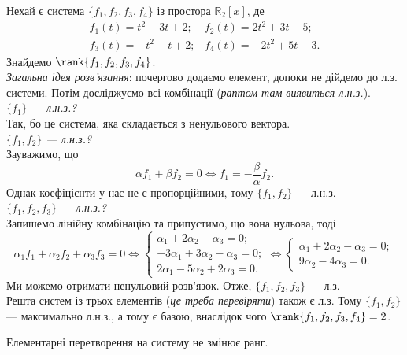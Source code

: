 \documentclass{math_library}
\begin{document}
	\begin{example}
	Нехай є система $\{f_1, f_2, f_3, f_4\}$ із простора $\mathbb{R}_2[x]$, де
	\[
	\begin{matrix}
	f_1(t) = t^2-3t+2; & f_2(t) = 2t^2+3t-5; \\
	f_3(t) = -t^2-t+2; & f_4(t) = -2t^2+5t-3.
	\end{matrix}
	\]
	Знайдемо $\rank \{f_1, f_2, f_3, f_4\}$.
	\bigskip \\
	\textit{Загальна ідея розв'язання}: почергово додаємо елемент, допоки не дійдемо до л.з. системи. Потім досліджуємо всі комбінації (\textit{раптом там виявиться л.н.з.}).\\
	\textit{$\{f_1\}$ --- л.н.з.?} \\
	Так, бо це система, яка складається з ненульового вектора.\\
	\textit{$\{f_1, f_2 \}$ --- л.н.з.?} \\
	Зауважимо, що
	\[
	\alpha f_1 + \beta f_2 = 0 \iff \displaystyle f_1 = -\frac{\beta}{\alpha}f_2.
	\]
	Однак коефіцієнти у нас не є пропорційними, тому $\{f_1, f_2\}$ --- л.н.з.\\
	\textit{$\{f_1, f_2, f_3\}$ --- л.н.з.?}\\
	Запишемо лінійну комбінацію та припустимо, що вона нульова, тоді
	\[
	\alpha_1 f_1 + \alpha_2 f_2 + \alpha_3 f_3 = 0 \iff 
	\begin{cases}
	\alpha_1 + 2\alpha_2 - \alpha_3 = 0; \\
	-3\alpha_1 + 3\alpha_2 - \alpha_3 = 0; \\
	2\alpha_1 - 5\alpha_2 + 2\alpha_3 = 0.
	\end{cases} \iff
	\begin{cases}
	\alpha_1 + 2\alpha_2 - \alpha_3 = 0; \\
	9\alpha_2 - 4\alpha_3 = 0.
	\end{cases}
	\]
	Ми можемо отримати ненульовий розв'язок. Отже, $\{f_1, f_2, f_3\}$ --- л.з.\\
	Решта систем із трьох елементів (\textit{це треба перевіряти}) також є л.з. Тому $\{f_1, f_2\}$ --- максимально л.н.з., а тому є базою, внаслідок чого $\rank\{f_1, f_2, f_3, f_4 \} = 2$.
	\end{example}
	
	\begin{theorem}
	Елементарні перетворення на систему не змінює ранг.
	\end{theorem}
	
\end{document}
